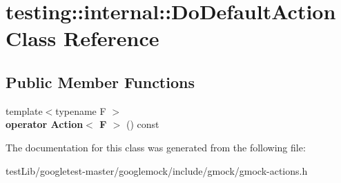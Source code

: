 \hypertarget{classtesting_1_1internal_1_1DoDefaultAction}{}\section{testing\+:\+:internal\+:\+:Do\+Default\+Action Class Reference}
\label{classtesting_1_1internal_1_1DoDefaultAction}
\subsection*{Public Member Functions}
\begin{DoxyCompactItemize}
\item 
\mbox{\label{classtesting_1_1internal_1_1DoDefaultAction_aea08828a0d64847e29ab7a5abeb74149}} 
{\footnotesize template$<$typename F $>$ }\\{\bfseries operator Action$<$ F $>$} () const
\end{DoxyCompactItemize}


The documentation for this class was generated from the following file\+:\begin{DoxyCompactItemize}
\item 
test\+Lib/googletest-\/master/googlemock/include/gmock/gmock-\/actions.\+h\end{DoxyCompactItemize}
